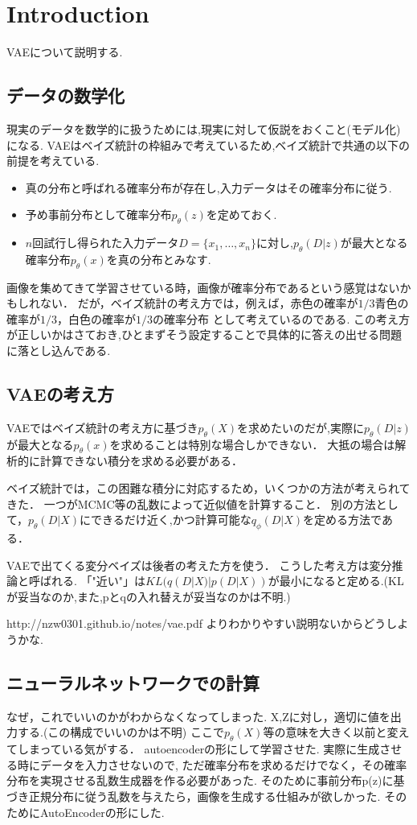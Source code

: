 \documentclass{ujarticle}
\begin{document}
\section{Introduction}
\label{sec:Introduction}
VAEについて説明する.

\subsection{データの数学化}
\label{sub:データの数学化}
現実のデータを数学的に扱うためには,現実に対して仮説をおくこと(モデル化)になる.
VAEはベイズ統計の枠組みで考えているため,ベイズ統計で共通の以下の前提を考えている.
\begin{itemize}
  \item 真の分布と呼ばれる確率分布が存在し,入力データはその確率分布に従う.
  \item 予め事前分布として確率分布$p_{\theta}(z)$を定めておく.
  \item $n$回試行し得られた入力データ$D=\{x_1,\dots,x_n\}$に対し,$p_{\theta}(D|z)$が最大となる確率分布$p_{\theta}(x)$を真の分布とみなす.
\end{itemize}
画像を集めてきて学習させている時，画像が確率分布であるという感覚はないかもしれない．
だが，ベイズ統計の考え方では，例えば，赤色の確率が$1/3$青色の確率が$1/3$，白色の確率が$1/3$の確率分布
として考えているのである.
この考え方が正しいかはさておき,ひとまずそう設定することで具体的に答えの出せる問題に落とし込んである.


\subsection{VAEの考え方}
\label{sub:VAEの考え方}
VAEではベイズ統計の考え方に基づき$p_{\theta}(X)$を求めたいのだが,実際に$p_{\theta}(D|z)$が最大となる$p_{\theta}(x)$を求めることは特別な場合しかできない．
大抵の場合は解析的に計算できない積分を求める必要がある．

ベイズ統計では，この困難な積分に対応するため，いくつかの方法が考えられてきた．
一つがMCMC等の乱数によって近似値を計算すること．
別の方法として，$p_{\theta}(D|X)$にできるだけ近く,かつ計算可能な$q_{\phi}(D|X)$を定める方法である．

VAEで出てくる変分ベイズは後者の考えた方を使う．
こうした考え方は変分推論と呼ばれる.
「"近い"」は$KL(q(D|X)|p(D|X))$が最小になると定める.(KLが妥当なのか,また,pとqの入れ替えが妥当なのかは不明.)


http://nzw0301.github.io/notes/vae.pdf
よりわかりやすい説明ないからどうしようかな.

\subsection{ニューラルネットワークでの計算}
\label{sub:ニューラルネットワークでの計算}
なぜ，これでいいのかがわからなくなってしまった.
X,Zに対し，適切に値を出力する.(この構成でいいのかは不明)
ここで$p_{\theta}(X)$等の意味を大きく以前と変えてしまっている気がする．
autoencoderの形にして学習させた.
実際に生成させる時にデータを入力させないので,
ただ確率分布を求めるだけでなく，その確率分布を実現させる乱数生成器を作る必要があった.
そのために事前分布p(z)に基づき正規分布に従う乱数を与えたら，画像を生成する仕組みが欲しかった.
そのためにAutoEncoderの形にした.
\end{document}
